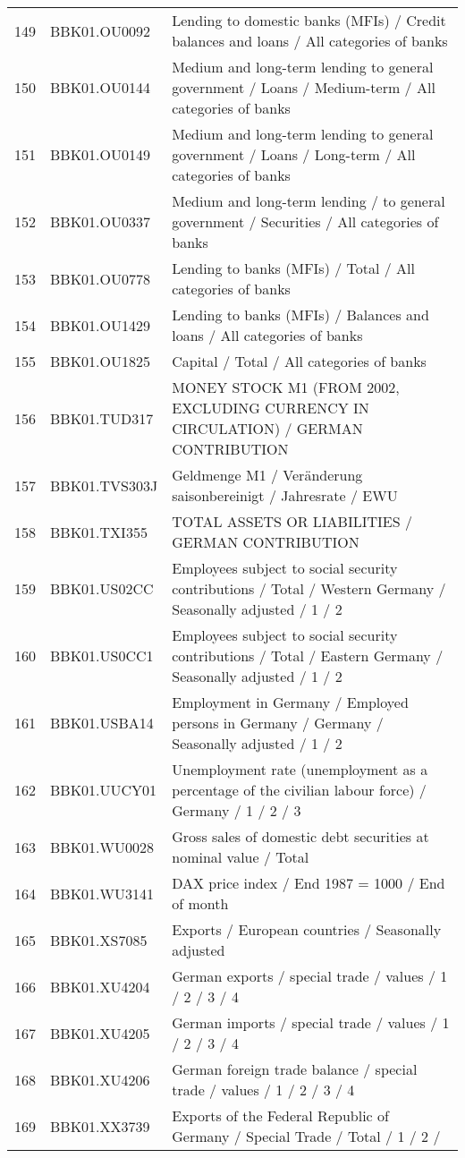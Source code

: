 \begin{table}[ht]
\begin{tabular}{rll}
  149 & BBK01.OU0092 & Lending to domestic banks (MFIs) / Credit balances and loans / All categories of banks \\ 
  150 & BBK01.OU0144 & Medium and long-term lending to general government / Loans / Medium-term / All categories of banks \\ 
  151 & BBK01.OU0149 & Medium and long-term lending to general government / Loans / Long-term / All categories of banks \\ 
  152 & BBK01.OU0337 & Medium and long-term lending / to general government / Securities / All categories of banks \\ 
  153 & BBK01.OU0778 & Lending to banks (MFIs) / Total / All categories of banks \\ 
  154 & BBK01.OU1429 & Lending to banks (MFIs) / Balances and loans / All categories of banks \\ 
  155 & BBK01.OU1825 & Capital / Total / All categories of banks \\ 
  156 & BBK01.TUD317 & MONEY STOCK M1 (FROM 2002, EXCLUDING CURRENCY IN CIRCULATION) / GERMAN CONTRIBUTION \\ 
  157 & BBK01.TVS303J & Geldmenge M1 /                                                   Veränderung saisonbereinigt / Jahresrate / EWU \\ 
  158 & BBK01.TXI355 & TOTAL ASSETS OR LIABILITIES / GERMAN CONTRIBUTION \\ 
  159 & BBK01.US02CC & Employees subject to social security contributions / Total / Western Germany / Seasonally adjusted / 1 / 2 \\ 
  160 & BBK01.US0CC1 & Employees subject to social security contributions / Total / Eastern Germany / Seasonally adjusted / 1 / 2 \\ 
  161 & BBK01.USBA14 & Employment in Germany / Employed persons in Germany / Germany / Seasonally adjusted / 1 / 2 \\ 
  162 & BBK01.UUCY01 & Unemployment rate (unemployment as a percentage of the civilian labour force) / Germany / 1 / 2 / 3 \\ 
  163 & BBK01.WU0028 & Gross sales of domestic debt securities at nominal value / Total \\ 
  164 & BBK01.WU3141 & DAX price index / End 1987 = 1000 / End of month \\ 
  165 & BBK01.XS7085 & Exports / European countries / Seasonally adjusted \\ 
  166 & BBK01.XU4204 & German exports / special trade / values / 1 / 2 / 3 / 4 \\ 
  167 & BBK01.XU4205 & German imports / special trade / values / 1 / 2 / 3 / 4 \\ 
  168 & BBK01.XU4206 & German foreign trade balance / special trade / values / 1 / 2 / 3 / 4 \\ 
  169 & BBK01.XX3739 & Exports of the Federal Republic of Germany / Special Trade / Total / 1 / 2 / \\ 
   \hline
\end{tabular}
\end{table}

